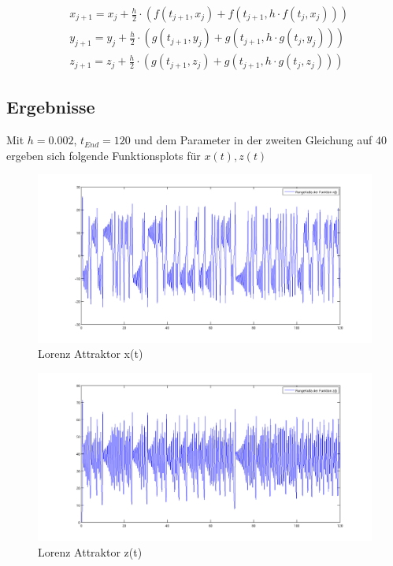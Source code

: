 \documentclass[10pt]{scrartcl}
\begin{document}
		\begin{align}
				&x_{j+1}=x_{j} + \frac{h}{2} \cdot (f(t_{j+1}, x_{j}) + f(t_{j+1}, h \cdot f(t_j, x_j)) )\\
				&y_{j+1}=y_{j} + \frac{h}{2} \cdot (g(t_{j+1}, y_{j}) + g(t_{j+1}, h \cdot g(t_j, y_j)) )\\
				&z_{j+1}=z_{j} + \frac{h}{2} \cdot (g(t_{j+1}, z_{j}) + g(t_{j+1}, h \cdot g(t_j, z_j)) )
		\end{align}
		
		\subsection{Ergebnisse}		
		Mit $h=0.002$, $t_{End} = 120$ und dem Parameter in der zweiten Gleichung auf $40$ ergeben sich folgende Funktionsplots für $x(t), z(t)$
		\begin{figure}[H]
			\centering	
			\includegraphics[width=\textwidth]{lorenzxt.png}
            \caption{Lorenz Attraktor x(t)}
            \label{pic:xt}
		\end{figure} 
		
		\begin{figure}[H]
			\centering	
			\includegraphics[width=\textwidth]{lorenzzt.png}
            \caption{Lorenz Attraktor z(t)}
            \label{pic:zt}
		\end{figure} 
		
\end{document}
